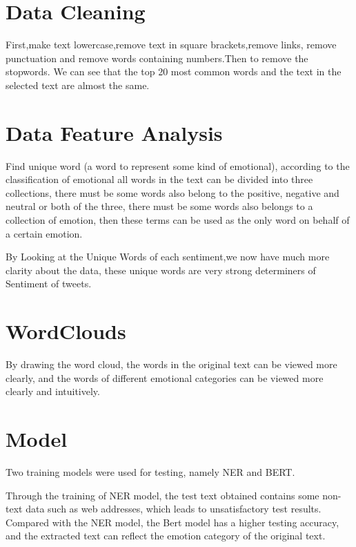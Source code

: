 \section{Data Cleaning} \label{sec-conclusions}
First,make text lowercase,remove text in square brackets,remove links,
remove punctuation and remove words containing numbers.Then to remove the stopwords.
We can see that the top 20 most common words and the text in the selected text are almost the same.

\section{Data Feature Analysis} \label{sec-conclusions}
Find unique word (a word to represent some kind of emotional), 
according to the classification of emotional all words in the text can be divided into three collections, 
there must be some words also belong to the positive, 
negative and neutral or both of the three, 
there must be some words also belongs to a collection of emotion,
then these terms can be used as the only word on behalf of a certain emotion.

By Looking at the Unique Words of each sentiment,we now have much more clarity about the data,
these unique words are very strong determiners of Sentiment of tweets.

\section{WordClouds} \label{sec-conclusions}
By drawing the word cloud, 
the words in the original text can be viewed more clearly, 
and the words of different emotional categories can be viewed more clearly and intuitively.

\section{Model} \label{sec-conclusions}
Two training models were used for testing, namely NER and BERT.

Through the training of NER model, 
the test text obtained contains some non-text data such as web addresses,
 which leads to unsatisfactory test results.
Compared with the NER model,
 the Bert model has a higher testing accuracy, 
 and the extracted text can reflect the emotion category of the original text.
